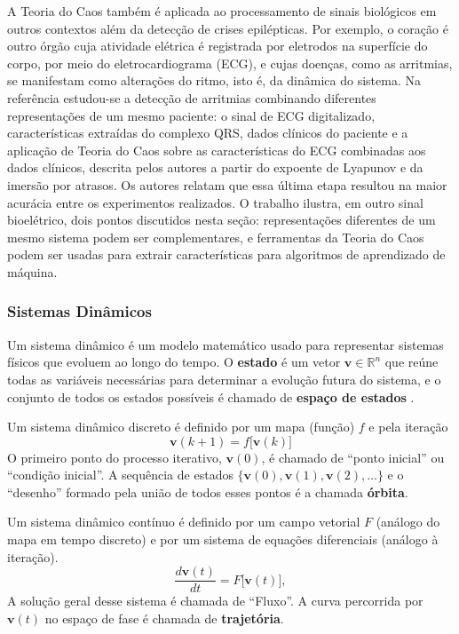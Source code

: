 \documentclass[]{article}
\begin{document}
	A Teoria do Caos também é aplicada ao processamento de sinais biológicos em outros contextos além da detecção de crises epilépticas. Por exemplo, o coração é outro órgão cuja atividade elétrica é registrada por eletrodos na superfície do corpo, por meio do eletrocardiograma (ECG), e cujas doenças, como as arritmias, se manifestam como alterações do ritmo, isto é, da dinâmica do sistema. Na referência \cite{aboghazalah2024arrhythmia} estudou-se a detecção de arritmias combinando diferentes representações de um mesmo paciente: o sinal de ECG digitalizado, características extraídas do complexo QRS, dados clínicos do paciente e a aplicação de Teoria do Caos sobre as características do ECG combinadas aos dados clínicos, descrita pelos autores a partir do expoente de Lyapunov e da imersão por atrasos. Os autores relatam que essa última etapa resultou na maior acurácia entre os experimentos realizados. O trabalho ilustra, em outro sinal bioelétrico, dois pontos discutidos nesta seção: representações diferentes de um mesmo sistema podem ser complementares, e ferramentas da Teoria do Caos podem ser usadas para extrair características para algoritmos de aprendizado de máquina.
	
	\subsubsection{Sistemas Dinâmicos}
	\noindent
	Um sistema dinâmico é um modelo matemático usado para representar sistemas físicos que evoluem ao longo do tempo. O \textbf{estado} é um vetor $\mathbf{v} \in \mathbb{R}^n$ que reúne todas as variáveis necessárias para determinar a evolução futura do sistema, e o conjunto de todos os estados possíveis é chamado de \textbf{espaço de estados} \cite{strogatz2015nonlinear, alligood1996chaos}.

	Um sistema dinâmico discreto é definido por um mapa (função) $f$ e pela iteração
	\begin{equation}
		\mathbf{v}(k+1) = f\big[\mathbf{v}(k)\big]
	\end{equation}
	O primeiro ponto do processo iterativo, $\mathbf{v}(0)$, é chamado de ``ponto inicial'' ou ``condição inicial''. A sequência de estados $\{\mathbf{v}(0), \mathbf{v}(1), \mathbf{v}(2), \dots\}$ e o ``desenho'' formado pela união de todos esses pontos é a chamada \textbf{órbita}.

	Um sistema dinâmico contínuo é definido por um campo vetorial  $F$  (análogo do mapa em tempo discreto) e por um sistema de equações diferenciais (análogo à iteração).
	\begin{equation}
		\frac{d\mathbf{v}(t)}{dt} = F\big[\mathbf{v}(t)\big],
	\end{equation}
	A solução geral desse sistema é chamada de ``Fluxo''. A curva percorrida por $\mathbf{v}(t)$ no espaço de fase é chamada de \textbf{trajetória}. 
	
\end{document}
